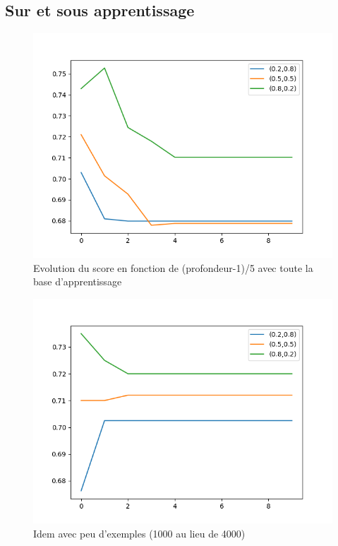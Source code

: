 \documentclass[a4paper]{article}
\begin{document}
\subsection*{Sur et sous apprentissage}

\begin{figure}[ht!]
\begin{center}
\includegraphics[scale=0.5]{Figure_1}
\caption{Evolution du score en fonction de (profondeur-1)/5 avec toute la base d'apprentissage}
\label{apprentissage_prof1}
\end{center}
\end{figure}

\begin{figure}[ht!]
\begin{center}
\includegraphics[scale=0.5]{Figure_3}
\caption{Idem avec peu d'exemples (1000 au lieu de 4000)}
\label{apprentissage_prof2}
\end{center}
\end{figure}
\end{document}
